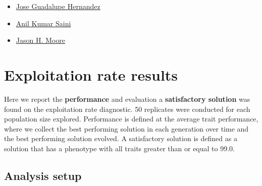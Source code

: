\documentclass[
]{book}
\providecommand{\tightlist}{%
  \setlength{\itemsep}{0pt}\setlength{\parskip}{0pt}}
\begin{document}
\begin{itemize}
\tightlist
\item
  \href{https://jgh9094.github.io/}{Jose Guadalupe Hernandez}
\item
  \href{https://theaksaini.github.io/}{Anil Kumar Saini}
\item
  \href{https://jasonhmoore.org/}{Jason H. Moore}
\end{itemize}

\hypertarget{exploitation-rate-results}{%
\chapter{Exploitation rate results}\label{exploitation-rate-results}}

Here we report the \textbf{performance} and evaluation a \textbf{satisfactory solution} was found on the exploitation rate diagnostic.
50 replicates were conducted for each population size explored.
Performance is defined at the average trait performance, where we collect the best performing solution in each generation over time and the best performing solution evolved.
A satisfactory solution is defined as a solution that has a phenotype with all traits greater than or equal to 99.0.

\hypertarget{analysis-setup}{%
\section{Analysis setup}\label{analysis-setup}}
\end{document}
